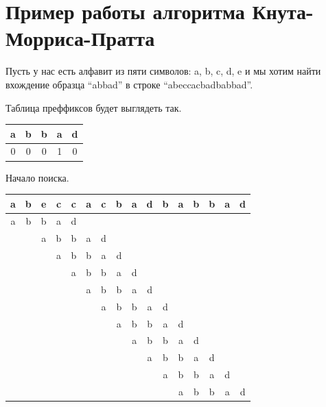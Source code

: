 \documentclass[12pt]{report}
\begin{document}
\section{Пример работы алгоритма Кнута-Морриса-Пратта}

Пусть у нас есть алфавит из пяти символов: a, b, c, d, e и мы хотим найти вхождение образца “abbad” в строке “abeccacbadbabbad”.

Таблица преффиксов будет выглядеть так.

\begin{table}[h]
		\begin{tabular}{| c | c | c | c | c |}
	 	\hline
		a & b & b & a & d \\ \hline
    0 & 0 & 0 & 1 & 0 \\ \hline
		\end{tabular}
\end{table}

Начало поиска.

\begin{table}[h]
		\begin{tabular}{| c | c | c | c | c | c | c | c | c | c | c | c | c | c | c | c |}
	 	\hline
		a & b & e & c & c & a & c & b & a & d & b & a & b & b & a & d \\ \hline
    a & b & b & a & d & & & & & & & & & & & \\ \hline
		& & a & b & b & a & d & & & & & & & & & \\ \hline
	  & & & a & b & b & a & d & & & & & & & & \\ \hline
		& & & & a & b & b & a & d & & & & & & & \\ \hline
		& & & & & a & b & b & a & d & & & & & & \\ \hline
		& & & & & & a & b & b & a & d & & & & & \\ \hline
		& & & & & & & a & b & b & a & d & & & & \\ \hline
		& & & & & & & & a & b & b & a & d & & & \\ \hline
		& & & & & & & & & a & b & b & a & d & & \\ \hline
		& & & & & & & & & & a & b & b & a & d & \\ \hline
		& & & & & & & & & & & a & b & b & a & d \\ \hline
		\end{tabular}
\end{table}
\end{document}
